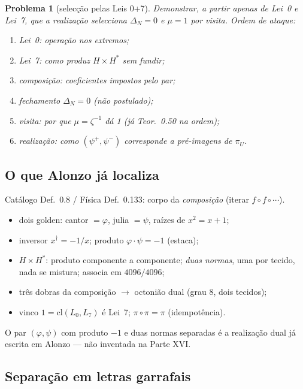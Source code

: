 \documentclass[11pt,a4paper]{article}
\newtheorem{problema}[teorema]{Problema}
\begin{document}
\begin{problema}[selecção pelas Leis 0+7]
\label{prob:defeitos}
Demonstrar, a partir apenas de Lei~0 e Lei~7, que a realização selecciona
$\Delta_N=0$ e $\mu=1$ por visita. Ordem de ataque:
\begin{enumerate}[leftmargin=1.2em,itemsep=1pt]
  \item Lei~0: operação nos extremos;
  \item Lei~7: como produz $H\times H^*$ sem fundir;
  \item composição: coeficientes impostos pelo par;
  \item fechamento $\Delta_N=0$ (não postulado);
  \item visita: por que $\mu=\zeta^{-1}$ dá 1 (já Teor.~0.50 na ordem);
  \item realização: como $(\psi^+,\psi^-)$ corresponde a pré-imagens de $\pi_U$.
\end{enumerate}
\end{problema}

\subsection{O que Alonzo já localiza}

Catálogo Def.~0.8 / Física Def.~0.133: corpo da \emph{composição} (iterar $f\circ f\circ\cdots$).
\begin{itemize}[leftmargin=1.2em,itemsep=1pt]
  \item dois golden: cantor $=\varphi$, julia $=\psi$, raízes de $x^2=x+1$;
  \item inversor $x^\dagger=-1/x$; produto $\varphi\cdot\psi=-1$ (estaca);
  \item $H\times H^*$: produto componente a componente; \emph{duas normas}, uma por
        tecido, nada se mistura; associa em $4096/4096$;
  \item três dobras da composição $\to$ octonião dual (grau 8, dois tecidos);
  \item vinco $1=\mathrm{cl}(L_0,L_7)$ é Lei~7; $\pi\circ\pi=\pi$ (idempotência).
\end{itemize}
O par $(\varphi,\psi)$ com produto $-1$ e duas normas separadas é a realização dual
já escrita em Alonzo --- não inventada na Parte XVI.

\subsection{Separação em letras garrafais}
\end{document}
